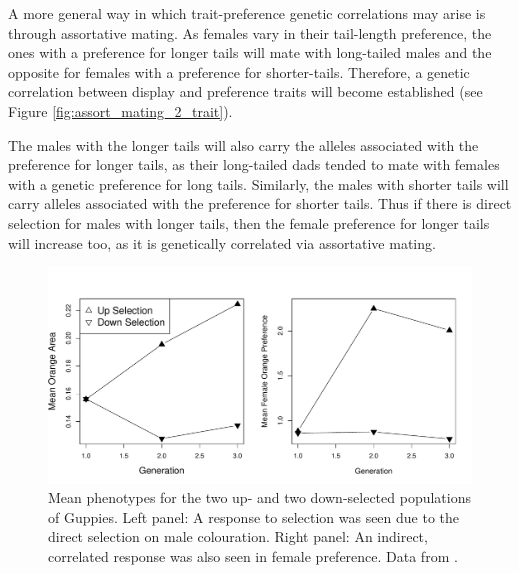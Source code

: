A more general way in which trait-preference genetic correlations may arise is through assortative mating. As females vary in their
tail-length preference, the ones with a preference for longer
tails will mate with long-tailed males and the opposite for females
with a preference for shorter-tails. Therefore, a
genetic correlation between display and preference traits will
become established (see Figure \ref{fig:assort_mating_2_trait}). 

The males with the longer tails will also carry the alleles
associated with the preference for longer tails, as their long-tailed
dads tended to mate with females with a genetic preference for long
tails. Similarly, the males with shorter tails will carry alleles associated with the preference for
shorter tails. Thus if there is direct selection for males with longer tails, then
the female preference for longer tails will increase too, as it is
genetically correlated via assortative mating. 

\begin{figure}
\begin{center}
\includegraphics[width=\textwidth]{Journal_figs/Quant_gen/guppies_female_choice/guppies_female_choice.pdf}
\end{center} 
\caption{Mean phenotypes for the two up- and two down-selected
  populations of Guppies. Left panel: A response to selection was seen
  due to the direct selection on male colouration. Right panel: An
  indirect, correlated response was also seen in female
  preference. Data from
  \citet{houde:94}. } \label{fig:assort_mating_guppies}
\end{figure}

